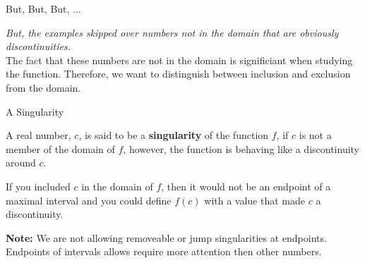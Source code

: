 \documentclass{ximera}
\begin{document}
\begin{observation} But, But, But, ...

\textit{But, the examples skipped over numbers not in the domain that are obviously discontinuities.}  \\

The fact that these numbers are not in the domain is significiant when studying the function.  Therefore, we want to distinguish between inclusion and exclusion from the domain.



\end{observation}










\begin{idea} A Singularity 

A real number, $c$, is said to be a \textbf{singularity} of the function $f$, if $c$ is not a member of the domain of $f$, however, the function is behaving like a discontinuity around $c$.

If you included $c$ in the domain of $f$, then it would not be an endpoint of a maximal interval and you could define $f(c)$ with a value that made $c$ a discontinuity.

\end{idea}


\textbf{Note:} We are not allowing removeable or jump singularities at endpoints. Endpoints of intervals allows require more attention then other numbers.
\end{document}
